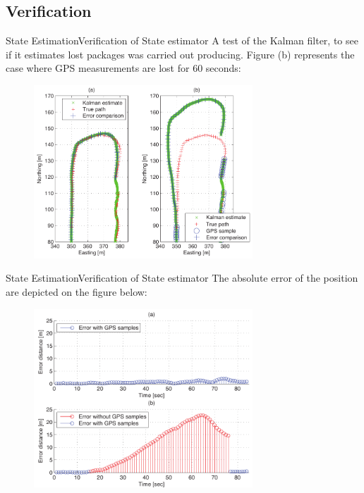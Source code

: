 \documentclass[10pt]{beamer}
\begin{document}
\subsection{Verification}
\begin{frame}{State Estimation}{Verification of State estimator}
A test of the Kalman filter, to see if it estimates lost packages was carried out producing. Figure (b) represents the case where GPS measurements are lost for 60 seconds:
\begin{figure}
			\begin{center}
				\includegraphics[width=8.2cm]{img/track}
				\label{fig:track}
			\end{center}
		\end{figure}
\end{frame}

\begin{frame}{State Estimation}{Verification of State estimator}
The absolute error of the position are depicted on the figure below:
\begin{figure}
			\begin{center}
				\includegraphics[width=8.2cm]{img/error}
				\label{fig:error}
			\end{center}
		\end{figure}
\end{frame}
\end{document}
